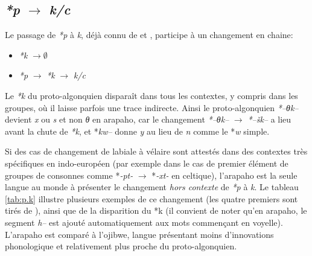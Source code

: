 \documentclass[twoside,a4paper,11pt]{article}
\newcommand{\ipa}[1]{{\phon\textit{#1}}}
\newcommand{\Σ}{\greek{Σ}}
\begin{document}
\subsection{\ipa{*p} $\rightarrow$ \ipa{k/c} }
Le passage de \ipa{*p} à \ipa{k}, déjà connu de \citet{kroeber16arapaho} et \citet{michelson35shifts}, participe à un changement en chaine:

\begin{itemize}
\item \ipa{*k} $\rightarrow \emptyset$
\item \ipa{*p} $\rightarrow$ \ipa{*k} $\rightarrow$  \ipa{k/c}
\end{itemize}

Le  \ipa{*k} du proto-algonquien disparaît dans tous les contextes, y compris dans les groupes, où il laisse parfois une trace indirecte. Ainsi le proto-algonquien \ipa{*--θk--} devient \ipa{x} ou \ipa{s} et non \ipa{θ} en arapaho, car le changement \ipa{*--θk--} $\rightarrow $  \ipa{*--šk--} a lieu avant la chute de \ipa{*k}, et *\ipa{kw--} donne \ipa{y} au lieu de \ipa{n} comme le *\ipa{w} simple.

Si des cas de changement de labiale à vélaire sont attestés dans des contextes très spécifiques en indo-européen (par exemple dans le cas de premier élément de groupes de consonnes comme *\ipa{-pt-} $\rightarrow$ *\ipa{-xt-} en celtique), l'arapaho est la seule langue au monde à présenter le changement \textit{hors contexte} de  \ipa{*p} à \ipa{k}. Le tableau \ref{tab:p.k} illustre plusieurs exemples de ce changement (les quatre premiers sont tirés de  \citealt{goddard74arapaho}), ainsi que de la disparition du *k (il convient de noter qu'en arapaho, le segment \ipa{h--} est ajouté automatiquement aux mots commençant en voyelle). L'arapaho est comparé à l'ojibwe, langue présentant moins d'innovations phonologique et relativement plus proche du proto-algonquien.
\end{document}
